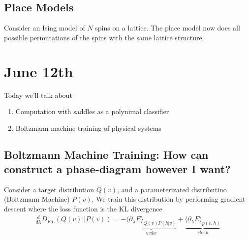\subsection{Place Models}
Consider an Ising model of $N$ spins on a lattice. The place model now does all possible permutations of the spins with the same lattice structure.


\section{June 12th}
Today we'll talk about
\begin{enumerate}
	\item Computation with saddles as a polynimal classifier
	\item Boltzmann machine training of physical systems
\end{enumerate}
\subsection{Boltzmann Machine Training: How can construct a phase-diagram however I want?}
Consider a target distribution $Q(v)$, and a parameterizated distributino (Boltzmann Machine) $P(v)$. We train this distribution by performing gradient descent where the loss function is the KL divergence
\begin{align}
	\frac{d}{d\lambda}D_{KL}(Q(v) || P(v)) = - \underbrace{\langle \partial_\lambda E\rangle_{Q(v) P(h|v)}}_{wake}+ \underbrace{\langle \partial_\lambda E\rangle_{p(v,h)}}_{sleep}
\end{align}





















\newpage


